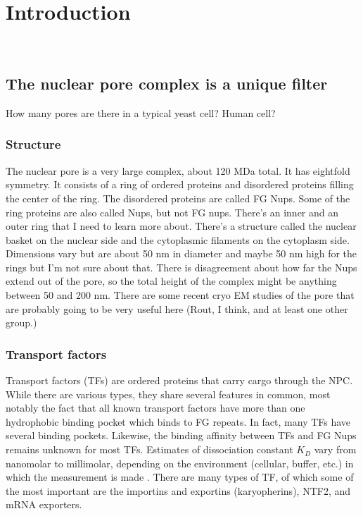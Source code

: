 \chapter{Introduction}~\label{ch01_introduction}

\section{The nuclear pore complex is a unique filter}
How many pores are there in a typical yeast cell? Human cell?
\subsection{Structure}
The nuclear pore is a very large complex, about 120 MDa total.  It has eightfold symmetry.  It consists of a ring of ordered proteins and disordered proteins filling the center of the ring.  The disordered proteins are called FG Nups.  Some of the ring proteins are also called Nups, but not FG nups.  There's an inner and an outer ring that I need to learn more about.  There's a structure called the nuclear basket on the nuclear side and the cytoplasmic filaments on the cytoplasm side.  Dimensions vary but are about 50 nm in diameter and maybe 50 nm high for the rings but I'm not sure about that.  There is disagreement about how far the Nups extend out of the pore, so the total height of the complex might be anything between 50 and 200 nm.  There are some recent cryo EM studies of the pore that are probably going to be very useful here (Rout, I think, and at least one other group.)

\subsection{Transport factors}

Transport factors (TFs) are ordered proteins that carry cargo through the NPC.  While there are various types, they share several features in common, most notably the fact that all known transport factors have more than one hydrophobic binding pocket which binds to FG repeats.  In fact, many TFs have several binding pockets.  Likewise, the binding affinity between TFs and FG Nups remains unknown for most TFs.  Estimates of dissociation constant $K_D$ vary from nanomolar to millimolar, depending on the environment (cellular, buffer, etc.) in which the measurement is made \cite{things}. There are many types of TF, of which some of the most important are the importins and exportins (karyopherins), NTF2, and mRNA exporters.

